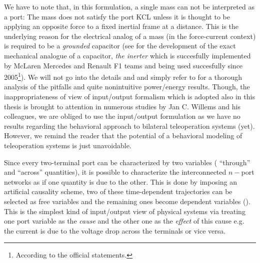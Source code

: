 \begin{rem}
We have to note that, in this formulation, a single mass can not be interpreted as a port: The mass does not satisfy the 
port KCL unless it is thought to be applying an opposite force to a fixed inertial frame at a distance. This is the underlying
reason for the electrical analog of a mass (in the force-current context) is required to be a \emph{grounded} capacitor 
(see \cite{smith} for the development of the exact mechanical analogue of a capacitor, \emph{the inerter} which is succesfully implemented by 
McLaren Mercedes and Renault F1 teams and being used succesfully since 2005\footnote{According to the official statements.}). We will not 
go into the details and and simply refer to \cite{willemsCSM} for a thorough analysis of the pitfalls and quite nonintuitive power/energy 
results. Though, the inappropriateness of view of input/output formalism which is adopted also in this thesis is brought to attention in 
numerous studies by Jan C. Willems and his colleagues, we are obliged to use the input/output formulation as we have no results 
regarding the behavioral approach to bilateral teleoperation systems (yet). However, we remind the reader that the potential 
of a behavioral modeling of teleoperation systems is just unavoidable. 
\end{rem}


Since every two-terminal port can be characterized by two variables ( ``through'' and ``across'' quantities), it is possible to 
characterize the interconnected $n-$port networks as if one quantity is due to the other. This is done by imposing an artificial 
causality scheme, two of these time-dependent trajectories can be selected as free variables and the remaining ones become dependent variables 
(\cite{behavbook}). This is the simplest kind of input/output view of physical systems via treating one port variable as the 
\emph{cause} and the other one as the \emph{effect} of this cause e.g. the current is due to the voltage drop across the terminals or 
vice versa. 


